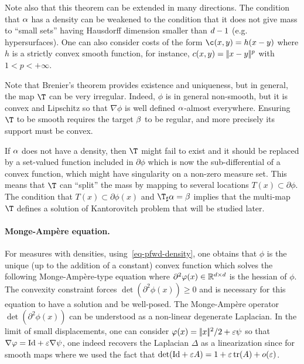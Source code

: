 Note also that this theorem can be extended in many directions.  
% 
The condition that $\alpha$ has a density can be weakened to the condition that it does not give mass to ``small sets'' having Hausdorff dimension smaller than $d-1$ (e.g. hypersurfaces). 
%
One can also consider costs of the form $\c(x,y)=h(x-y)$ where $h$ is a strictly convex smooth function, for instance, $c(x,y)=|\!| x-y |\!|^p$ with $1<p<+\infty$. 

Note that Brenier's theorem provides existence and uniqueness, but in general, the map $\T$ can be very irregular. 
%
Indeed, $\phi$ is in general non-smooth, but it is convex and Lipschitz so that $\nabla \phi$ is well defined $\alpha$-almost everywhere. Ensuring $\T$ to be smooth requires the target $\beta$ to be regular, and more precisely its support must be convex.

If $\alpha$ does not have a density, then $\T$ might fail to exist and it should be replaced by a set-valued function included in $\partial\phi$ which is now the sub-differential of a convex function, which might have singularity on a non-zero measure set. This means that $\T$ can ``split'' the mass by mapping to several locations  $T(x) \subset \partial\phi$. The condition that $T(x) \subset \partial\phi(x)$ and $\T_\sharp \al=\be$ implies that the multi-map $\T$ defines a solution of Kantorovitch problem that will be studied later. 


\paragraph{Monge-Amp\`ere equation.}

For measures with densities, using~\eqref{eq-pfwd-density}, one obtains that $\phi$ is the unique (up to the addition of a constant) convex function which solves the following Monge-Amp\`ere-type equation
where $\partial^2\varphi(x) \in \mathbb{R}^{d \times d}$ is the hessian of $\phi$. 
%
The convexity constraint forces $\det(\partial^2\phi(x)) \geq 0$ and is necessary for this equation to have a solution and be well-posed. 
%
The Monge-Amp\`ere operator $\det(\partial^2\phi(x))$ can be understood as a non-linear degenerate Laplacian. In the limit of small displacements, one can consider $\varphi(x)=|\!| x |\!|^2/2 + \varepsilon\psi$ so that $\nabla \varphi = \mathrm{Id}+\varepsilon \nabla \psi$, one indeed recovers the Laplacian $\Delta$ as a linearization since for smooth maps
where we used the fact that $\det(\mathrm{Id}+\varepsilon A) = 1+\varepsilon\operatorname{tr}(A)+o(\varepsilon)$. 



